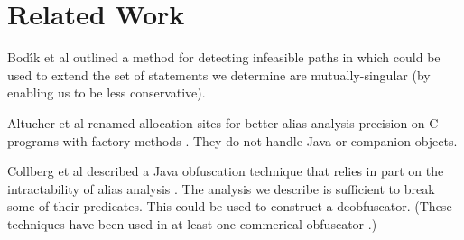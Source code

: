 \documentclass[11pt,notitlepage]{article}
\begin{document}
\section{Related Work}

Bod{\'\i}k et al outlined a method for detecting infeasible paths
in \cite{267921} which could be used to extend the set of statements
we determine are mutually-singular (by enabling us to be less conservative).

Altucher et al renamed allocation sites for better alias analysis
precision on C programs with factory methods \cite{199466}.  They
do not handle Java or companion objects.

Collberg et al described a Java obfuscation technique that relies in
part on the intractability of alias analysis \cite{268962}.  The
analysis we describe is sufficient to break some of their predicates.
This could be used to construct a deobfuscator.  (These techniques
have been used in at least one commerical obfuscator \cite{humper02}.)



\end{document}
